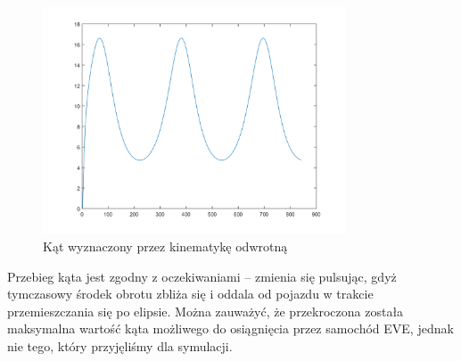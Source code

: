\documentclass[a4paper, 12pt]{report}
\begin{document}
				\begin{figure}[H]
					\centering
					\includegraphics[width = 0.8\textwidth]{./AP/img/rev/elipse_in_3.png}
					\caption{Kąt wyznaczony przez kinematykę odwrotną}
				\end{figure}
				\noindent Przebieg kąta jest zgodny z oczekiwaniami -- zmienia się pulsując, gdyż tymczasowy środek obrotu zbliża się i oddala od pojazdu w trakcie przemieszczania się po elipsie. Można zauważyć, że przekroczona została maksymalna wartość kąta możliwego do osiągnięcia przez samochód EVE, jednak nie tego, który przyjęliśmy dla symulacji.
			\newpage
\end{document}
